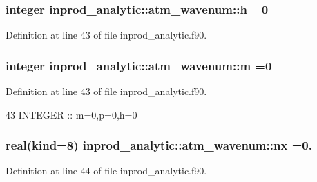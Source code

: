\subsubsection[{\texorpdfstring{h}{h}}]{\setlength{\rightskip}{0pt plus 5cm}integer inprod\+\_\+analytic\+::atm\+\_\+wavenum\+::h =0\hspace{0.3cm}{\ttfamily [private]}}\hypertarget{structinprod__analytic_1_1atm__wavenum_aa7df1690e97e43365ca0c2b1222924b5}{}\label{structinprod__analytic_1_1atm__wavenum_aa7df1690e97e43365ca0c2b1222924b5}


Definition at line 43 of file inprod\+\_\+analytic.\+f90.

\subsubsection[{\texorpdfstring{m}{m}}]{\setlength{\rightskip}{0pt plus 5cm}integer inprod\+\_\+analytic\+::atm\+\_\+wavenum\+::m =0\hspace{0.3cm}{\ttfamily [private]}}\hypertarget{structinprod__analytic_1_1atm__wavenum_a72be0a86c5f5801b88ebf78506523bd2}{}\label{structinprod__analytic_1_1atm__wavenum_a72be0a86c5f5801b88ebf78506523bd2}


Definition at line 43 of file inprod\+\_\+analytic.\+f90.


\begin{DoxyCode}
43      \textcolor{keywordtype}{INTEGER} :: m=0,p=0,h=0
\end{DoxyCode}
\subsubsection[{\texorpdfstring{nx}{nx}}]{\setlength{\rightskip}{0pt plus 5cm}real(kind=8) inprod\+\_\+analytic\+::atm\+\_\+wavenum\+::nx =0.\hspace{0.3cm}{\ttfamily [private]}}\hypertarget{structinprod__analytic_1_1atm__wavenum_ad67bf9989f5524b1f97dc7211ef78db2}{}\label{structinprod__analytic_1_1atm__wavenum_ad67bf9989f5524b1f97dc7211ef78db2}


Definition at line 44 of file inprod\+\_\+analytic.\+f90.


